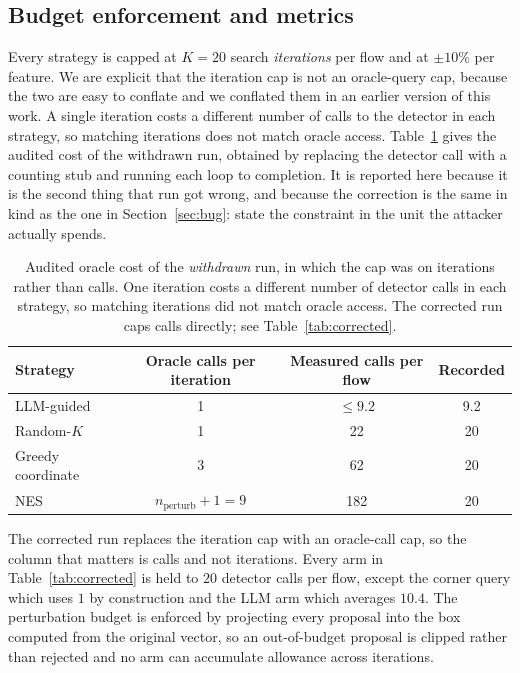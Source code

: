 \documentclass[journal]{IEEEtran}
\theoremstyle{definition}
\newcommand{\Kbudget}{20}
\newcommand{\budgetpct}{10}
\newcommand{\LLMq}{9.2}
\newcommand{\CBudget}{20}
\newcommand{\CCornerCalls}{1}
\newcommand{\CLlmCalls}{10.4}
\begin{document}
\subsection{Budget enforcement and metrics}
\label{sec:budget}

Every strategy is capped at $K=\Kbudget$ search \emph{iterations} per flow and at
$\pm\budgetpct$\% per feature. We are explicit that the iteration cap is not an
oracle-query cap, because the two are easy to conflate and we conflated them in
an earlier version of this work. A single iteration costs a different number of
calls to the detector in each strategy, so matching iterations does not match
oracle access. Table~\ref{tab:queryaudit} gives the audited cost of the withdrawn run,
obtained by replacing the detector call with a counting stub and running each
loop to completion. It is reported here because it is the second thing that run
got wrong, and because the correction is the same in kind as the one in
Section~\ref{sec:bug}: state the constraint in the unit the attacker actually
spends.

\begin{table}[t]
\caption{Audited oracle cost of the \emph{withdrawn} run, in which the cap was
on iterations rather than calls. One iteration costs a different number of
detector calls in each strategy, so matching iterations did not match oracle
access. The corrected run caps calls directly; see
Table~\ref{tab:corrected}.}
\label{tab:queryaudit}
\centering
\footnotesize
\setlength{\tabcolsep}{4pt}
\begin{tabular}{lccc}
\toprule
Strategy & Oracle calls per iteration & Measured calls per flow & Recorded \\
\midrule
LLM-guided & 1 & $\le \LLMq$ & \LLMq \\
Random-$K$ & 1 & 22 & 20 \\
Greedy coordinate & 3 & 62 & 20 \\
NES & $n_{\text{perturb}}+1 = 9$ & 182 & 20 \\
\bottomrule
\end{tabular}
\end{table}

The corrected run replaces the iteration cap with an oracle-call cap, so the
column that matters is calls and not iterations. Every arm in
Table~\ref{tab:corrected} is held to $\CBudget$ detector calls per flow, except
the corner query which uses $\CCornerCalls$ by construction and the LLM arm
which averages $\CLlmCalls$. The perturbation budget is enforced by projecting
every proposal into the box computed from the original vector, so an
out-of-budget proposal is clipped rather than rejected and no arm can accumulate
allowance across iterations.
\end{document}
